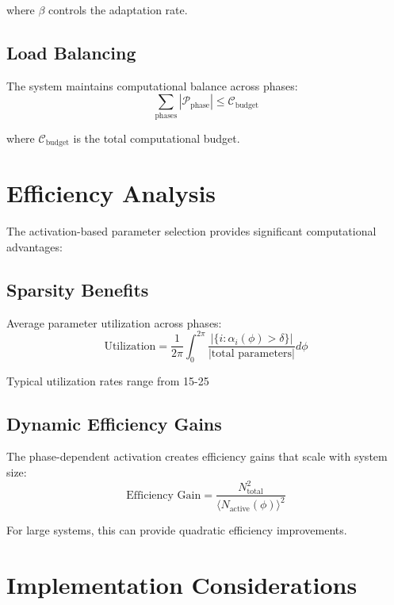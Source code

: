 where $\beta$ controls the adaptation rate.

\subsection{Load Balancing}

The system maintains computational balance across phases:
\begin{equation}
\sum_{\text{phases}} |\mathcal{P}_{\text{phase}}| \leq \mathcal{C}_{\text{budget}}
\end{equation}

where $\mathcal{C}_{\text{budget}}$ is the total computational budget.

\section{Efficiency Analysis}

The activation-based parameter selection provides significant computational advantages:

\subsection{Sparsity Benefits}

Average parameter utilization across phases:
\begin{equation}
\text{Utilization} = \frac{1}{2\pi} \int_0^{2\pi} \frac{|\{i : \alpha_i(\phi) > \delta\}|}{|\text{total parameters}|} d\phi
\end{equation}

Typical utilization rates range from 15-25%

\subsection{Dynamic Efficiency Gains}

The phase-dependent activation creates efficiency gains that scale with system size:
\begin{equation}
\text{Efficiency Gain} = \frac{N_{\text{total}}^2}{\langle N_{\text{active}}(\phi) \rangle^2}
\end{equation}

For large systems, this can provide quadratic efficiency improvements.

\section{Implementation Considerations}

